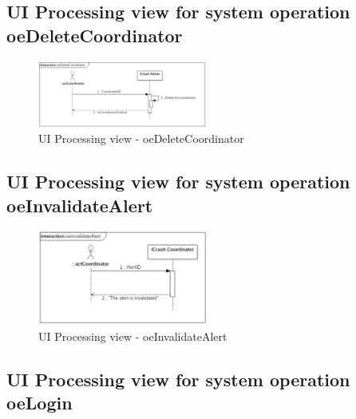 \subsection{UI Processing view for system operation oeDeleteCoordinator}

\begin{figure}[h]
	\centering	
	\captionsetup{justification=centering}
	\includegraphics[width=0.5\textwidth]{./images/ui_oeDeleteCoordinator.eps}
	\caption{UI Processing view - oeDeleteCoordinator}
\end{figure}


\subsection{UI Processing view for system operation oeInvalidateAlert}

\begin{figure}[h]
	\centering	
	\captionsetup{justification=centering}
	\includegraphics[width=0.5\textwidth]{./images/ui_oeInvalidateAlert.eps}
	\caption{UI Processing view - oeInvalidateAlert}
\end{figure}


\subsection{UI Processing view for system operation oeLogin}

